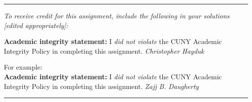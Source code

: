 \documentclass[11pt, reqno]{amsart}
\theoremstyle{plain}
\theoremstyle{definition}
\theoremstyle{example}
\newcommand{\NOTE}[1]{{\color{blue}#1}}
\begin{document}
\vfill


\hrule
\emph{\small To receive credit for this assignment, include the following in your solutions [edited appropriately]:}

\smallskip

\textbf{Academic integrity statement:} I \emph{did not violate} the CUNY Academic Integrity Policy in completing this assignment. \hfill \emph{Christopher Hayduk}


\medskip

\NOTE{For example:\\
\textbf{Academic integrity statement:} I \emph{did not violate} the CUNY Academic Integrity Policy in completing this assignment. \hfill \emph{Zajj B. Daugherty}}
\medskip
\hrule

\vfill
\end{document}
